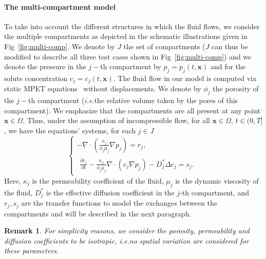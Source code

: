 \documentclass[10pt]{article}
\newcommand{\ie}{\emph{i.e.}\;}
\newcommand{\1}{^{(1)}}
\newcommand{\2}{^{(2)}}
\renewcommand{\div}{\nabla\cdot}
\newcommand{\Lap}{\Delta}
\newcommand {\x}   {\mathbf{x}}
\newtheorem{remark}[theorem]{Remark}
\begin{document}
\paragraph{The multi-compartment model}
To take into account the different structures in which the fluid flows, we consider the multiple compartments as depicted in the schematic illustrations given in Fig~\ref{fig:multi-comp}. We denote by $J$ the set of compartments ($J$ can thus be modified to describe all three test cases shown in Fig~\ref{fig:multi-comp}) and we denote the pressure in the $j-$th compartment by $p_j = p_j(t,\x)$ and for the solute concentration $c_j = c_j(t,\x)$. 
The fluid flow in our model is computed via static MPET equations~\cite{Bai_1993_Multiporosity, tully_ventikos_2011} without displacements.
We denote by $\phi_j$ the porosity of the $j-$th compartment (\ie the relative volume taken by the pores of this compartment).
We emphasize that the compartments are all present at any point $\x\in \Omega$. Thus, under the assumption of incompressible flow, for all $\x\in \Omega,\, t\in (0,T]$, we have the equations' systems, for each $j\in J$
\begin{equation}
    \begin{cases}
         -  \nabla\cdot( \frac{\kappa_j}{\phi_j \mu_j} \nabla p_j) = r_j,\\ %
          \begin{multlined} \frac{\partial c_j}{\partial t} - \frac{ \kappa_j}{\phi_j \mu_j}\div\left( c_j  \nabla p_j\right)  - D_j^* \Lap c_j 
         = s_j.%
         \end{multlined}
    \end{cases}
    \label{eq:main-system}
\end{equation}
Here, $\kappa_j$ is the permeability coefficient of the fluid, $\mu_j$ is the dynamic viscosity of the fluid, $D_j^*$ is the effective diffusion coefficient in the $j$-th compartment, and $r_{j}, s_{j}$ are the transfer functions to model the exchanges between the compartments and will be described in the next paragraph. 

\begin{remark}
    For simplicity reasons, we consider the porosity, permeability and diffusion coefficients to be isotropic, \ie no spatial variation are considered for these parameters. 
\end{remark}
\end{document}
